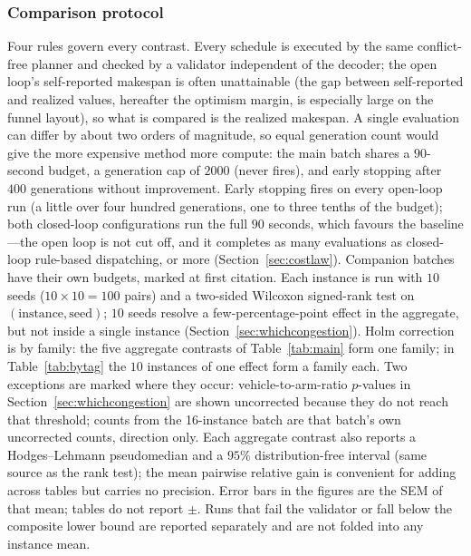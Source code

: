 \documentclass[manuscript,screen,review]{acmart}
\newcommand{\NCases}{10}
\newcommand{\NSeeds}{10}
\newcommand{\NPairs}{100}
\newcommand{\MatrixCells}{16}
\begin{document}
\subsubsection{Comparison protocol}
\label{sec:protocol}

Four rules govern every contrast.
Every schedule is executed by the same conflict-free planner and checked by a validator independent of the decoder; the open loop's self-reported makespan is often unattainable (the gap between self-reported and realized values, hereafter the optimism margin, is especially large on the funnel layout), so what is compared is the realized makespan.
A single evaluation can differ by about two orders of magnitude, so equal generation count would give the more expensive method more compute: the main batch shares a $90$-second budget, a generation cap of $2000$ (never fires), and early stopping after $400$ generations without improvement.
Early stopping fires on every open-loop run (a little over four hundred generations, one to three tenths of the budget); both closed-loop configurations run the full $90$ seconds, which favours the baseline---the open loop is not cut off, and it completes as many evaluations as closed-loop rule-based dispatching, or more (Section~\ref{sec:costlaw}).
Companion batches have their own budgets, marked at first citation.
Each instance is run with $\NSeeds$ seeds ($\NCases\times\NSeeds=\NPairs$ pairs) and a two-sided Wilcoxon signed-rank test on $(\text{instance},\text{seed})$; $\NSeeds$ seeds resolve a few-percentage-point effect in the aggregate, but not inside a single instance (Section~\ref{sec:whichcongestion}).
Holm correction is by family: the five aggregate contrasts of Table~\ref{tab:main} form one family; in Table~\ref{tab:bytag} the $\NCases$ instances of one effect form a family each.
Two exceptions are marked where they occur: vehicle-to-arm-ratio $p$-values in Section~\ref{sec:whichcongestion} are shown uncorrected because they do not reach that threshold; counts from the \MatrixCells{}-instance batch are that batch's own uncorrected counts, direction only.
Each aggregate contrast also reports a Hodges--Lehmann pseudomedian and a $95\%$ distribution-free interval (same source as the rank test); the mean pairwise relative gain is convenient for adding across tables but carries no precision.
Error bars in the figures are the SEM of that mean; tables do not report $\pm$.
Runs that fail the validator or fall below the composite lower bound are reported separately and are not folded into any instance mean.
\end{document}
